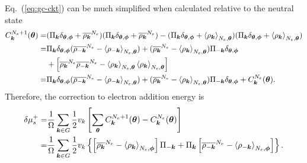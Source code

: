 Eq.~(\ref{eq:gc-ckt}) can be much simplified when calculated relative to the neutral state
\begin{align}
C_{\boldsymbol{k}}^{N_e+1}(\boldsymbol{\theta})=&
(\Pi_{\boldsymbol{k}}\delta_{\boldsymbol{\theta}, \boldsymbol{\phi}} + \overline{\rho_{\boldsymbol{k}}}^{N_e})(\Pi_{\boldsymbol{k}}\delta_{\boldsymbol{\theta}, \boldsymbol{\phi}} + \overline{\rho_{\boldsymbol{k}}}^{N_e}) -
(\Pi_{\boldsymbol{k}}\delta_{\boldsymbol{\theta}, \boldsymbol{\phi}}+\braket{\rho_{\boldsymbol{k}}}_{N_e,\boldsymbol{\theta}})(\Pi_{\boldsymbol{k}}\delta_{\boldsymbol{\theta}, \boldsymbol{\phi}}+\braket{\rho_{\boldsymbol{k}}}_{N_e,\boldsymbol{\theta}}) \nonumber \\
=& \Pi_{\boldsymbol{k}}\delta_{\boldsymbol{\theta}, \boldsymbol{\phi}}(\overline{\rho_{-\boldsymbol{k}}}^{N_e} - \braket{\rho_{-\boldsymbol{k}}}_{N_e, \boldsymbol{\theta}}) +
(\overline{\rho_{\boldsymbol{k}}}^{N_e} - \braket{\rho_{\boldsymbol{k}}}_{N_e, \boldsymbol{\theta}})\Pi_{-\boldsymbol{k}}\delta_{\boldsymbol{\theta}, \boldsymbol{\phi}} \nonumber \\
&+
\left[
\overline{\rho_{\boldsymbol{k}}}^{N_e}\overline{\rho_{-\boldsymbol{k}}}^{N_e} - \braket{\rho_{\boldsymbol{k}}}_{N_e, \boldsymbol{\theta}}\braket{\rho_{\boldsymbol{k}}}_{N_e, \boldsymbol{\theta}}
\right] \nonumber \\
=& \Pi_{\boldsymbol{k}}\delta_{\boldsymbol{\theta}, \boldsymbol{\phi}}(\overline{\rho_{-\boldsymbol{k}}}^{N_e} - \braket{\rho_{-\boldsymbol{k}}}_{N_e, \boldsymbol{\theta}}) +
(\overline{\rho_{\boldsymbol{k}}}^{N_e} - \braket{\rho_{\boldsymbol{k}}}_{N_e, \boldsymbol{\theta}})\Pi_{-\boldsymbol{k}}\delta_{\boldsymbol{\theta}, \boldsymbol{\phi}} + C_{\boldsymbol{k}}^{N_e}(\boldsymbol{\theta}).
\end{align}
Therefore, the correction to electron addition energy is
\begin{align}
\delta\mu_s^+ =& \frac{1}{\Omega} \sum\limits_{\boldsymbol{k}\in G} \frac{1}{2}v_k \left[ \sum\limits_{\boldsymbol{\theta}} C_{\boldsymbol{k}}^{N_e+1}(\boldsymbol{\theta})-C_{\boldsymbol{k}}^{N_e}(\boldsymbol{\theta}) \right] \nonumber \\
=& \frac{1}{\Omega} \sum\limits_{\boldsymbol{k}\in G} \frac{1}{2}v_k \left\{
\left[
\overline{\rho_{\boldsymbol{k}}}^{N_e}-\braket{\rho_{\boldsymbol{k}}}_{N_e,\boldsymbol{\phi}}
\right]\Pi_{-\boldsymbol{k}} +\Pi_{\boldsymbol{k}}\left[
\overline{\rho_{-\boldsymbol{k}}}^{N_e}-\braket{\rho_{-\boldsymbol{k}}}_{N_e,\boldsymbol{\phi}}
\right]
\right\}.
\end{align}
